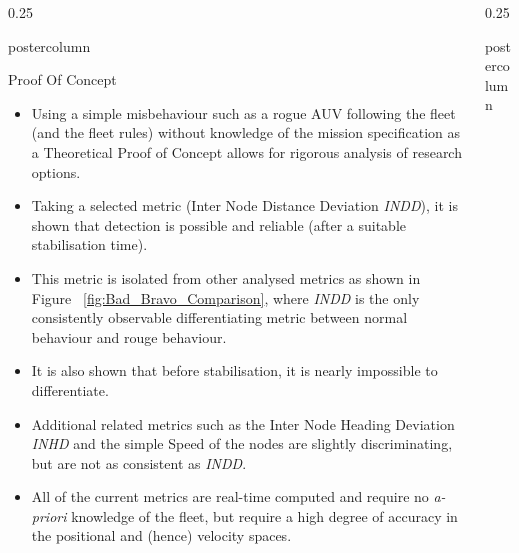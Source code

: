 \documentclass[final,hyperref={pdfpagelabels=false}]{beamer}
\newlength{\columnheight}
\def\colwidth{0.25\linewidth}
\begin{document}
\begin{frame}[fragile]
\begin{columns}[t]
\begin{column}{\colwidth}
\begin{beamercolorbox}[center,wd=\textwidth]{postercolumn}
\begin{minipage}[T]{.98\textwidth}
{\begin{block}{Proof Of Concept}
\begin{itemize}
                \item Using a simple misbehaviour such as a rogue AUV following the fleet (and the fleet rules) without knowledge of the mission 
                  specification as a Theoretical Proof of Concept allows for rigorous analysis of research options.
                \item Taking a selected metric (Inter Node Distance Deviation \emph{INDD}), it is shown that detection is possible and reliable (after a suitable 
                  stabilisation time).
                \item This metric is isolated from other analysed metrics as shown in Figure ~\ref{fig:Bad_Bravo_Comparison}, where \emph{INDD} 
                  is the only consistently observable differentiating metric between normal behaviour and rouge behaviour.
                \item It is also shown that before stabilisation, it is nearly impossible to differentiate.
                \item Additional related metrics such as the Inter Node Heading Deviation \emph{INHD} and the simple Speed of the nodes are slightly 
                  discriminating, but are not as consistent as \emph{INDD}.
                \item All of the current metrics are real-time computed and require no \emph{a-priori} knowledge of the fleet, but require a high degree of 
                  accuracy in the positional and (hence) velocity spaces.
              \end{itemize}
            \end{block}   

          }
        \end{minipage}
      \end{beamercolorbox}
    \end{column}

    \begin{column}{\colwidth}
      \begin{beamercolorbox}[center,wd=\textwidth]{postercolumn}
        \begin{minipage}[T]{.98\textwidth} %
          \parbox[t][\columnheight]{\textwidth}{ %
 
}
\end{minipage}
\end{beamercolorbox}
\end{column}
\end{columns}
\end{frame}
\end{document}
